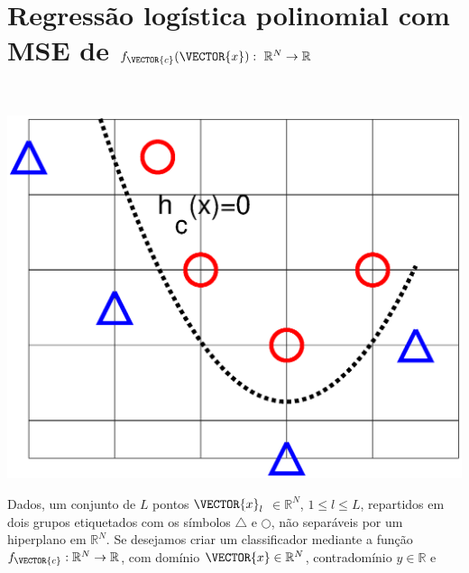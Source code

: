 \newpage

\section{Regressão logística polinomial com MSE de $f_{\VECTOR{c}}(\VECTOR{x}):~\mathbb{R}^{N} \rightarrow \mathbb{R}$}


\begin{theorem}\label{theo:reglogrnr1poly:1}
~\\
\noindent
\begin{minipage}{0.45\textwidth}
\centering
\includegraphics[width=0.95\linewidth]{chapters/classificacao/mfiles/reglogrnr1poly/reglogrnr1poly.eps} 
\end{minipage}
\begin{minipage}{0.55\textwidth}
Dados, um conjunto de $L$ pontos
$\VECTOR{x}_l$ $\in \mathbb{R}^{N}$, $1\leq l \leq L$,
repartidos em dois grupos etiquetados com os símbolos $\bigtriangleup$ e $\bigcirc$,
não separáveis por um hiperplano  em $\mathbb{R}^{N}$.
Se desejamos criar um classificador mediante 
a função  $f_{\VECTOR{c}}:\mathbb{R}^{N} \rightarrow \mathbb{R}$,
com domínio $\VECTOR{x} \in \mathbb{R}^{N}$, contradomínio $y \in \mathbb{R}$ e 

\end{minipage}
\end{theorem}
